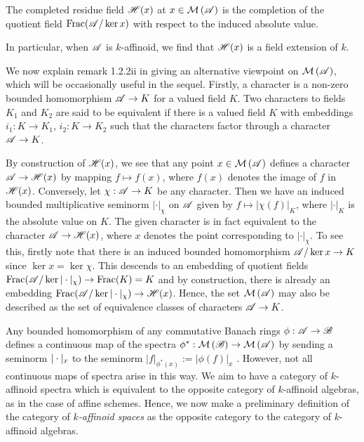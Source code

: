 \begin{defn}
    The completed residue field $\mathscr{H}(x)$ at $x \in \mathcal{M}\left(\mathscr{A}\right)$ is the completion of the quotient field $\operatorname{Frac}(\mathscr{A}/\ker x)$ with respect to the induced absolute value.
\end{defn}

In particular, when $\mathscr{A}$ is $k$-affinoid, we find that $\mathscr{H}(x)$ is a field extension of $k$.

We now explain remark 1.2.2ii in \parencite{berk1} giving an alternative viewpoint on $\mathcal{M}\left(\mathscr{A}\right)$, which will be occasionally useful in the sequel.
Firstly, a character is a non-zero bounded homomorphism $\mathscr{A} \to K$ for a valued field $K$. Two characters to fields $K_1$ and $K_2$ are said to be equivalent if there is a valued field $K$ with embeddings $i_1: K \to K_1$, $i_2: K \to K_2$ such that the characters factor through a character $\mathscr{A} \to K$. 

By construction of $\mathscr{H}(x)$, we see that any point $x \in \mathcal{M}\left(\mathscr{A}\right)$ defines a character $\mathscr{A} \to \mathscr{H}(x)$ by mapping $f \mapsto f(x)$, where $f(x)$ denotes the image of $f$ in $\mathscr{H}(x)$. 
Conversely, let $\chi: \mathscr{A} \to K$ be any character. Then we have an induced bounded multiplicative seminorm $|\cdot|_\chi$ on $\mathscr{A}$ given by $f \mapsto |\chi(f)|_K$, where $|\cdot|_K$ is the absolute value on $K$.
The given character is in fact equivalent to the character $\mathscr{A} \to \mathscr{H}(x)$, where $x$ denotes the point corresponding to $|\cdot|_\chi$. To see this, firstly note that there is an induced bounded homomorphism $\mathscr{A}/\ker x \to K$ since $\ker x = \ker \chi$. 
This descends to an embedding of quotient fields $\operatorname{Frac}(\mathscr{A}/\ker |\cdot|_\chi) \to \operatorname{Frac}(K) = K$ and by construction, there is already an embedding $\operatorname{Frac}(\mathscr{A}/\ker |\cdot|_\chi) \to \mathscr{H}(x)$. Hence, the set $\mathcal{M}\left(\mathscr{A}\right)$ may also be described as the set of equivalence classes of characters $\mathscr{A} \to K$.

Any bounded homomorphism of any commutative Banach rings $\phi: \mathscr{A} \to \mathscr{B}$ defines a continuous map of the spectra $\phi^{*}: \mathcal{M}\left(\mathscr{B}\right) \to \mathcal{M}\left(\mathscr{A}\right)$ by sending a seminorm $|\cdot|_x$ to the seminorm $|f|_{\phi^*(x)} := |\phi(f)|_x$ \parencite[\S 1.2.2 iii]{berk1}. 
However, not all continuous maps of spectra arise in this way.
We aim to have a category of $k$-affinoid spectra which is equivalent to the opposite category of $k$-affinoid algebras, as in the case of affine schemes.
Hence, we now make a preliminary definition of the category of \textit{$k$-affinoid spaces} \kaff as the opposite category to the category of $k$-affinoid algebras.

